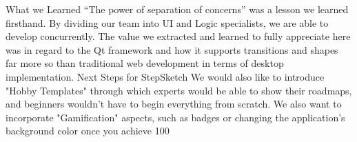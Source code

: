 What we Learned
“The power of separation of concerns” was a lesson we learned firsthand. By dividing our team into UI and Logic specialists, we are able to develop concurrently. The value we extracted and learned to fully appreciate here was in regard to the Qt framework and how it supports transitions and shapes far more so than traditional web development in terms of desktop implementation. Next Steps for StepSketch We would also like to introduce "Hobby Templates" through which experts would be able to show their roadmaps, and beginners wouldn’t have to begin everything from scratch. We also want to incorporate "Gamification" aspects, such as badges or changing the application’s background color once you achieve 100%
